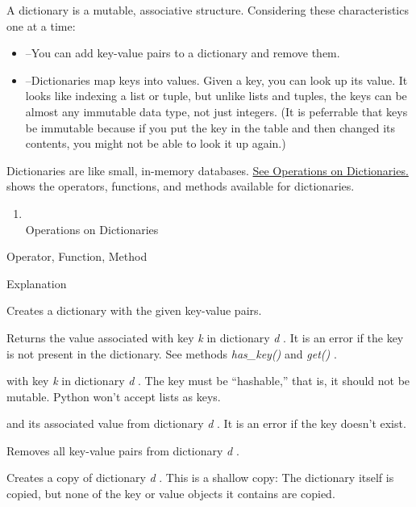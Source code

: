 A dictionary is a mutable,
associative structure. Considering these characteristics one at a time:

\begin{itemize}

\item
   --You can add
  key-value pairs to a dictionary and remove them.
\item
  
  --Dictionaries map keys into values. Given a key, you can look up its
  value. It looks like indexing a list or tuple, but unlike lists and
  tuples, the keys can be almost any immutable data type, not just
  integers. (It is peferrable that keys be immutable because if you put
  the key in the table and then changed its contents, you might not be
  able to look it up again.)
\end{itemize}

Dictionaries are like small,
in-memory databases. \href{chap2.html\#13000}{See Operations on
Dictionaries.} shows the operators, functions, and methods available for
dictionaries.

\begin{enumerate}

\item
  \\
  Operations on Dictionaries
\end{enumerate}

Operator, Function, Method

Explanation



Creates a dictionary with the given
key-value pairs.



Returns the value associated with
key \emph{k} in dictionary \emph{d} . It is an error if the key is not
present in the dictionary. See methods \emph{has\_key()} and
\emph{get()} .



 with key
\emph{k} in dictionary \emph{d} . The key must be ``hashable,'' that is,
it should not be mutable. Python won't accept lists as keys.



 and its
associated value from dictionary \emph{d} . It is an error if the key
doesn't exist.



Removes all key-value pairs from
dictionary \emph{d} .



Creates a copy of dictionary
\emph{d} . This is a shallow copy: The dictionary itself is copied, but
none of the key or value objects it contains are copied.




